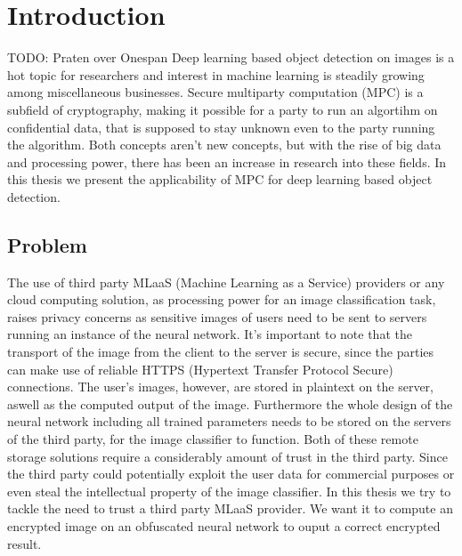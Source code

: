 
\chapter{Introduction}
TODO: Praten over Onespan
Deep learning based object detection on images is a hot topic for researchers and interest in machine learning is steadily growing among miscellaneous businesses.
\newline
Secure multiparty computation (MPC) is a subfield of cryptography, making it possible for a party to run an algortihm on confidential data, that is supposed to stay unknown even to the party running the algorithm.
\newline
Both concepts aren't new concepts, but with the rise of big data and processing power, there has been an increase in research into these fields.
\newline
In this thesis we present the applicability of MPC for deep learning based object detection.

\section{Problem}
The use of third party MLaaS (Machine Learning as a Service) providers or any cloud computing solution, as processing power for an image classification task, raises privacy concerns as sensitive images of users need to be sent to servers running an instance of the neural network. It's important to note that the transport of the image from the client to the server is secure, since the parties can make use of reliable HTTPS (Hypertext Transfer Protocol Secure) connections. The user's images, however, are stored in plaintext on the server, aswell as the computed output of the image. Furthermore the whole design of the neural network including all trained parameters needs to be stored on the servers of the third party, for the image classifier to function. Both of these remote storage solutions require a considerably amount of trust in the third party. Since the third party could potentially exploit the user data for commercial purposes or even steal the intellectual property of the image classifier. In this thesis we try to tackle the need to trust a third party MLaaS provider. We want it to compute an encrypted image on an obfuscated neural network to ouput a correct encrypted result.

